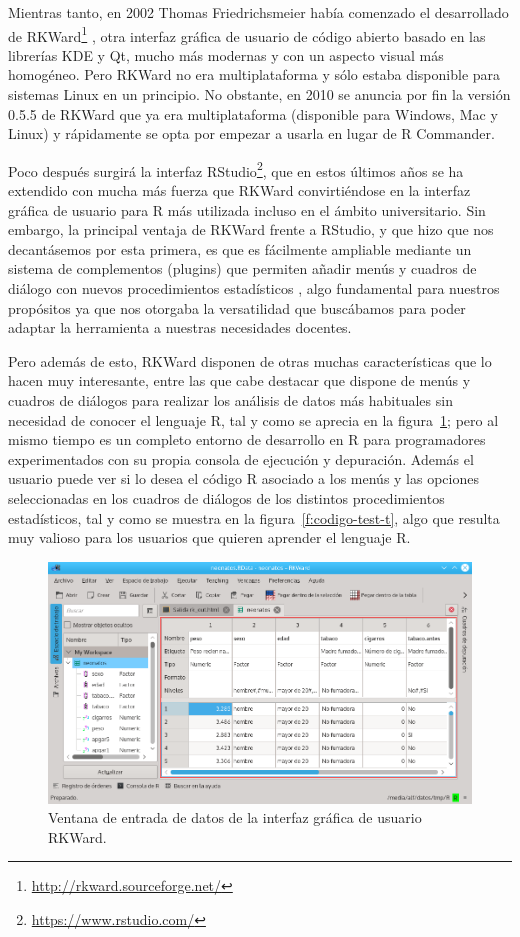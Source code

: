 \documentclass[a4paper,10pt,twoside]{article}
\newcommand{\rkward}{\textsf{RKWard}}
\newcommand{\rcommander}{\textsf{R Commander}}
\begin{document}
Mientras tanto, en 2002 Thomas Friedrichsmeier había comenzado el desarrollado de
\rkward{}\footnote{\url{http://rkward.sourceforge.net/}} \cite{rodiger2012rkward}, otra interfaz gráfica de usuario de
código abierto basado en las librerías KDE y Qt, mucho más modernas y con un aspecto visual más homogéneo.
Pero \rkward{} no era multiplataforma y sólo estaba disponible para sistemas Linux en un principio.
No obstante, en 2010 se anuncia por fin la versión 0.5.5 de \rkward{} que ya era multiplataforma (disponible para
Windows, Mac y Linux) y rápidamente se opta por empezar a usarla en lugar de \rcommander{}.

Poco después surgirá la interfaz \textsf{RStudio}\footnote{\url{https://www.rstudio.com/}}, que en estos últimos
años se ha extendido con mucha más fuerza que \rkward{} convirtiéndose en la interfaz gráfica de usuario para R más
utilizada incluso en el ámbito universitario.
Sin embargo, la principal ventaja de \rkward{} frente a \textsf{RStudio}, y que hizo que nos decantásemos por esta
primera, es que es fácilmente ampliable mediante un sistema de complementos (plugins) que permiten añadir menús y
cuadros de diálogo con nuevos procedimientos estadísticos \cite{friedrichsmeier2011introduction}, algo fundamental para
nuestros propósitos ya que nos otorgaba la versatilidad que buscábamos para poder adaptar la herramienta a nuestras
necesidades docentes.

Pero además de esto, \rkward{} disponen de otras muchas características que lo hacen muy interesante, entre las que cabe
destacar que dispone de menús y cuadros de diálogos para realizar los análisis de datos más habituales sin necesidad de
conocer el lenguaje R, tal y como se aprecia en la figura~\ref{f:ventana-datos-rkward}; pero al mismo tiempo es un
completo entorno de desarrollo en R para programadores experimentados con su propia consola de ejecución y depuración.
Además el usuario puede ver si lo desea el código R asociado a los menús y las opciones seleccionadas en los
cuadros de diálogos de los distintos procedimientos estadísticos, tal y como se muestra en la
figura~\ref{f:codigo-test-t}, algo que resulta muy valioso para los usuarios que quieren aprender el lenguaje R.

\begin{figure}[htbp!]
\centering
\includegraphics[width=\textwidth]{img/ventana_datos_rkward.png}
\caption{Ventana de entrada de datos de la interfaz gráfica de usuario \rkward{}.}
\label{f:ventana-datos-rkward}
\end{figure}
\end{document}
